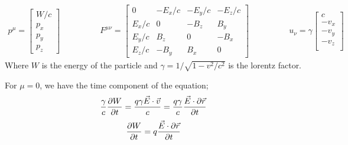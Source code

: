 \documentclass{article}
\begin{document}
\begin{equation}
    \begin{aligned}
        p^{\mu} = 
        \begin{bmatrix}
            W/c \\
            p_x         \\
            p_y \\
            p_z
        \end{bmatrix}    
    \end{aligned}
    \qquad\qquad
    \begin{aligned}
        F^{\mu\nu} = 
        \begin{bmatrix}
                0       & -E_x/c   & -E_y/c    & -E_z/c \\
                E_x/c   &   0      & -B_z      & B_y     \\
                E_y/c   &   B_z    &  0        & -B_x     \\
                E_z/c   &   -B_y   & B_x       & 0   
        \end{bmatrix} 
    \end{aligned}
    \qquad\qquad
    \begin{aligned}
        u_{\nu} = \gamma
        \begin{bmatrix}
                 c \\
                -v_x \\
                -v_y \\
                -v_z \\
        \end{bmatrix} 
    \end{aligned}
\end{equation}
\newline
Where $W$ is the energy of the particle and $\gamma = 1 / \sqrt{1 - v^2 / c^2}$ is the lorentz factor.
\newline

For $ \mu = 0 $, we have the time component of the equation;
\newline
\begin{equation}
    \frac{\gamma}{c}\frac{\partial W}{\partial t} = \frac{q \gamma \vec{E}\cdot \vec{v}}{c} = \frac{q \gamma}{c}  \frac{\vec{E}  \cdot \partial \vec{r}}{\partial t}
\end{equation}
\begin{equation}
    \frac{\partial W}{\partial t} = q \frac{\vec{E}\cdot \partial \vec{r}} {\partial t}
\end{equation}
\newline
\end{document}
